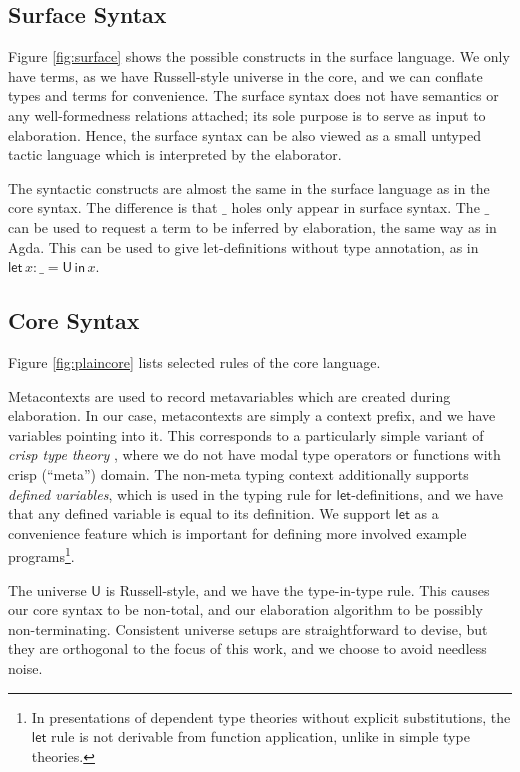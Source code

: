 \documentclass[acmsmall,screen,dvipsnames]{acmart}\settopmatter{}
\newcommand{\slet}{\boldsymbol{\mathsf{let}}}
\renewcommand{\sin}{\boldsymbol{\mathsf{in}}}
\renewcommand{\U}{\mathsf{U}}
\theoremstyle{remark}
\begin{document}
\subsection{Surface Syntax}
Figure \ref{fig:surface} shows the possible constructs in the surface
language. We only have terms, as we have Russell-style universe in the core, and
we can conflate types and terms for convenience. The surface syntax does not
have semantics or any well-formedness relations attached; its sole purpose is to
serve as input to elaboration. Hence, the surface syntax can be also viewed as a
small untyped tactic language which is interpreted by the elaborator.

The syntactic constructs are almost the same in the surface language as in
the core syntax. The difference is that $\_$ holes only appear in surface
syntax. The $\_$ can be used to request a term to be inferred by elaboration,
the same way as in Agda.  This can be used to give let-definitions without type
annotation, as in $\slet\,x : \_ = \U\,\sin\,x$.

\subsection{Core Syntax}
\label{sec:core}

Figure \ref{fig:plaincore} lists selected rules of the core language.

Metacontexts are used to record metavariables which are created during
elaboration. In our case, metacontexts are simply a context prefix, and we have
variables pointing into it. This corresponds to a particularly simple variant of
\emph{crisp type theory} \cite{licata2018internal}, where we do not have modal
type operators or functions with crisp (``meta'') domain. The non-meta typing
context additionally supports \emph{defined variables}, which is used in the
typing rule for $\slet$-definitions, and we have that any defined variable is
equal to its definition. We support $\slet$ as a convenience feature which is
important for defining more involved example programs\footnote{In presentations
  of dependent type theories without explicit substitutions, the $\slet$ rule is
  not derivable from function application, unlike in simple type theories.}.

The universe $\U$ is Russell-style, and we have the type-in-type rule.  This
causes our core syntax to be non-total, and our elaboration algorithm to be
possibly non-terminating. Consistent universe setups are straightforward to
devise, but they are orthogonal to the focus of this work, and we choose to
avoid needless noise.
\end{document}
